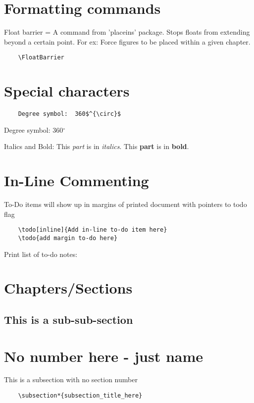 \documentclass[../main.tex]{subfiles}
\begin{document}
\section{Formatting commands}
Float barrier = A command from 'placeins' package.  Stops floats from extending beyond a certain point.  For ex:  Force figures to be placed within a given chapter.
\begin{verbatim}
    \FloatBarrier
\end{verbatim}

\section{Special characters}
\begin{verbatim}
    Degree symbol:  360$^{\circ}$
\end{verbatim}
Degree symbol:  360$^{\circ}$
\par
Italics and Bold:  This \textit{part} is in \textit{italics}.  This \textbf{part} is in \textbf{bold}.
\section{In-Line Commenting}
To-Do items will show up in margins of printed document with pointers to todo flag
\begin{verbatim}
    \todo[inline]{Add in-line to-do item here}
    \todo{add margin to-do here}
\end{verbatim}

Print list of to-do notes:
\listoftodos[Notes]
\section{Chapters/Sections}
\subsection{This is a sub-sub-section}
\section*{No number here - just name}
This is a subsection with no section number
\begin{verbatim}
    \subsection*{subsection_title_here}
\end{verbatim}
\end{document}
